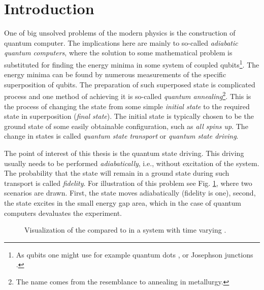 \chapter*{Introduction}
One of big unsolved problems of the modern physics is the construction of quantum computer. The implications here are mainly to so-called \emph{adiabatic quantum computers}, where the solution to some mathematical problem is substituted for finding the energy minima in some system of coupled qubits\footnote{As qubits one might use for example quantum dots \citep{dots}, or Josephson junctions \citep{josephson}.}. The energy minima can be found by numerous measurements of the specific superposition of qubits. The preparation of such superposed state is complicated process and one method of achieving it is so-called \emph{quantum annealing}\footnote{The name comes from the resemblance to annealing in metallurgy.}. This is the process of changing the state from some simple \emph{initial state} to the required state in superposition (\emph{final state}). The initial state is typically chosen to be the ground state of some easily obtainable configuration, such as \emph{all spins up}. The change in states is called \emph{quantum state transport} or \emph{quantum state driving}.

The point of interest of this thesis is the quantum state driving. This driving usually needs to be performed \emph{adiabatically}, i.e., without excitation of the system. The probability that the state will remain in a ground state during such transport is called \emph{fidelity}. For illustration of this problem see Fig. \ref{fig:introDriving}, where two scenarios are drawn. First, the state moves adiabatically (fidelity is one), second, the state excites in the small energy gap area, which in the case of quantum computers devaluates the experiment.

\begin{figure}[H]
    \centering
\caption{Visualization of the  compared to  in a system with time varying .}
    \label{fig:introDriving}
\end{figure}


